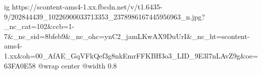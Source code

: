  
 
 
 
 

\ifcmt
  ig https://scontent-ams4-1.xx.fbcdn.net/v/t1.6435-9/202844439_10226900033713353_2378986167445956963_n.jpg?_nc_cat=102&ccb=1-7&_nc_sid=8bfeb9&_nc_ohc=ynC2_jamLKwAX9DuUrI&_nc_ht=scontent-ams4-1.xx&oh=00_AfAE_GqVFkQef3g8nkEmrFFKBH3o3_LID_9E3l7nLAvZ9g&oe=63FA0E58
  @wrap center
  @width 0.8
\fi
